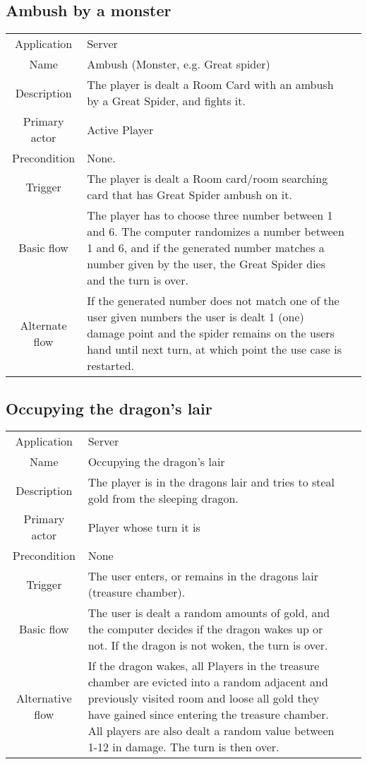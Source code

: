 \subsection{Ambush by a monster}
\label{ambushmonster}
\begin{tabular}{|c| p{9cm}|c}
\hline
Application &	Server \\
Name & Ambush (Monster, e.g. Great spider)\\
Description&  The player is dealt a Room Card with an ambush by a Great Spider, and fights it.\\
Primary actor & Active Player\\
Precondition &  None.\\
Trigger & The player is dealt a Room card/room searching card that has Great Spider ambush on it.\\ \hline
Basic flow & The player has to choose three number between 1 and 6. The computer randomizes a number between 1 and 6, and if the generated number matches a number given by the user, the Great Spider dies and the turn is over. \\ \hline
Alternate flow & If the generated number does not match one of the user given numbers the user is dealt 1 (one) damage point and the spider remains on the users hand until next turn, at which point the use case is restarted. \\
\hline
\end{tabular}


\subsection{Occupying the dragon's lair}
\label{dragonslair}
\begin{tabular}{|c| p{9cm}|c}
\hline
Application &  Server \\
Name &  Occupying the dragon's lair \\
Description & The player is in the dragons lair and tries to steal gold from the sleeping dragon. \\
Primary actor&  Player whose turn it is \\
Precondition & None \\
Trigger & The user enters, or remains in the dragons lair (treasure chamber). \\ \hline
Basic flow & The user is dealt a random amounts of gold, and the computer decides if the dragon wakes up or not. If the dragon is not woken, the turn is over. \\ \hline
Alternative flow & If the dragon wakes, all Players in the treasure chamber are evicted into a random adjacent and previously visited room and loose all gold they have gained since entering the treasure chamber. All players are also dealt a random value between 1-12 in damage. The turn is then over. \\
\hline
\end{tabular}


